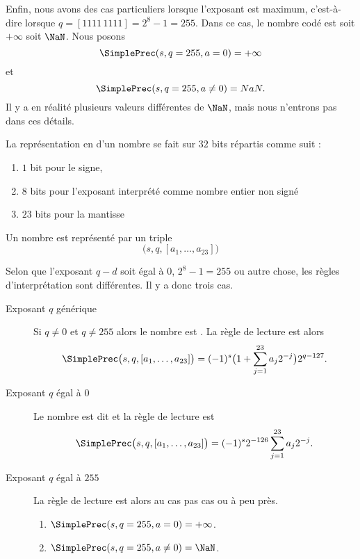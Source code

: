Enfin, nous avons des cas particuliers lorsque l'exposant est maximum, c'est-à-dire lorsque \( q=[1111\,1111]=2^8-1=255\). Dans ce cas, le nombre codé est soit \( +\infty\) soit \( \NaN\). Nous posons
\begin{equation}
	\SimplePrec(s,q=255,a=0)=+\infty
\end{equation}
et
\begin{equation}
	\SimplePrec(s,q=255,a\neq 0)=NaN.
\end{equation}
Il y a en réalité plusieurs valeurs différentes de \( \NaN\), mais nous n'entrons pas dans ces détails\cite{ooPOZNooQlGiUN}.

\begin{definition}        \label{DEFooEIOZooYLDVjs}
	La représentation en  d'un nombre se fait sur \( 32\) bits répartis comme suit :
	\begin{enumerate}
		\item
		      \( 1\) bit pour le signe,
		\item
		      \( 8\) bits pour l'exposant interprété comme nombre entier non signé
		\item
		      \( 23\) bits pour la mantisse
	\end{enumerate}

	Un nombre est représenté par un triple
	\begin{equation}
		\big( s,q,[a_1,\ldots, a_{23}] \big)
	\end{equation}

	Selon que l'exposant \( q-d\) soit égal à \( 0\), \( 2^8-1=255\) ou autre chose, les règles d'interprétation sont différentes. Il y a donc trois cas.
	\begin{description}
		\item[Exposant \( q\) générique\cite{ooMPTNooYbSwJS}]
			Si \( q\neq 0\) et \( q\neq 255\) alors le nombre est . La règle de lecture est alors
			\begin{equation}        \label{EQooEFEKooIrUaKj}
				\SimplePrec\big( s,q,[a_1,\ldots, a_{23}] \big)=(-1)^s\big( 1+\sum_{j=1}^{23}a_j2^{-j} \big)2^{q-127}.
			\end{equation}
		\item[Exposant \( q\) égal à \( 0\)] Le nombre est dit  et la règle de lecture est
			\begin{equation}        \label{EQooRTBFooIplydi}
				\SimplePrec\big( s,q,[a_1,\ldots, a_{23}] \big)=(-1)^s2^{-126}\sum_{j=1}^{23}a_j2^{-j}.
			\end{equation}
		\item[Exposant \( q\) égal à \( 255\)]
			La règle de lecture est alors au cas pas cas ou à peu près.
			\begin{enumerate}
				\item
				      \( \SimplePrec(s,q=255,a=0)=+\infty\).
				\item
				      \( \SimplePrec(s,q=255,a\neq 0)=\NaN\).
			\end{enumerate}
	\end{description}
\end{definition}


